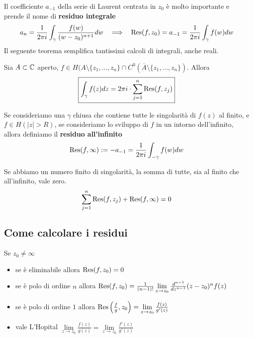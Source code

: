 Il coefficiente $a_{- 1}$ della serie di Laurent centrata in $z_{0}$ è molto importante e prende il nome di \textbf{residuo integrale}
\begin{equation*}
a_{n} = \frac{1}{2\pi i}\int_{\gamma}\frac{f(w)}{(w - z_{0})^{n + 1}} dw\ \ \implies \ \ \operatorname{Res} (f, z_{0}) = a_{- 1} = \frac{1}{2\pi i}\int_{\gamma} f(w) dw
\end{equation*}
Il seguente teorema semplifica tantissimi calcoli di integrali, anche reali.
\begin{thm}
Sia $A\subset \mathbb{C}$ aperto, $f\in H(A\setminus \{z_{1}, \dotsc, z_{n}\} \cap C^{0}(\overline{A} \setminus \{z_{1}, \dotsc, z_{n}\})$. Allora
\begin{equation*}
\boxed{\int_{\gamma} f(z) dz = 2\pi i \cdot \sum\limits^{n}_{j = 1}\operatorname{Res} (f, z_{j})}
\end{equation*}
\end{thm}
\begin{defn}
Se consideriamo una $\gamma $ chiusa che contiene tutte le singolarità di $f(z)$ al finito, e $f\in H(| z| > R)$, se consideriamo lo sviluppo di $f$ in un intorno dell'infinito, allora definiamo il \textbf{residuo all'infinito}
\begin{equation*}
\operatorname{Res} (f, \infty) : = - a_{- 1} = \frac{1}{2\pi i}\int_{- \gamma} f(w) dw
\end{equation*}
\end{defn}
\begin{thm}
Se abbiamo un numero finito di singolarità, la somma di tutte, sia al finito che all'infinito, vale zero.
\begin{equation*}
\sum\limits^{n}_{j = 1}\operatorname{Res} (f, z_{j}) + \operatorname{Res} (f, \infty) = 0
\end{equation*}
\end{thm}

\subsection{Come calcolare i residui}

Se $z_{0} \neq \infty $
\begin{itemize}
\item se è eliminabile allora $\operatorname{Res} (f, z_{0}) = 0$
\item se è polo di ordine $n$ allora $\operatorname{Res} (f, z_{0}) = \frac{1}{(n - 1)!}\lim\limits_{z\rightarrow z_{0}}\frac{d^{n - 1}}{dz^{n - 1}}(z - z_0)^n f(z)$
\item se è polo di ordine $1$ allora $\operatorname{Res} \left(\frac{f}{g}, z_{0}\right) = \lim\limits_{z\rightarrow z_{0}}\frac{f(z)}{g'(z)}$
\item vale L'Hopital $\lim\limits_{z\rightarrow z_{0}}\frac{f(z)}{g(z)} = \lim\limits_{z\rightarrow z_{0}}\frac{f'(z)}{g'(z)}$
\end{itemize}

